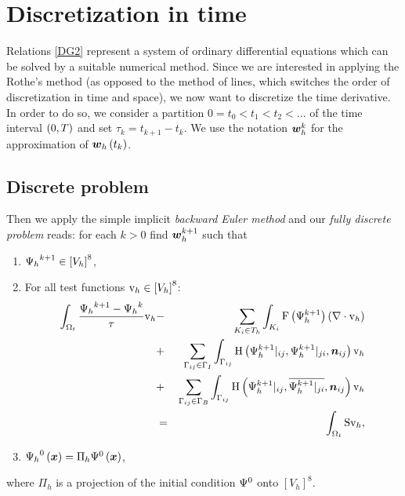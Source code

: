\section{Discretization in time}
Relations \ref{DG2} represent a system of ordinary differential equations which can be solved by a suitable numerical method. Since we are interested in applying the Rothe's method (as opposed to the method of lines, which switches the order of discretization in time and space), we now want to discretize the time derivative. In order to do so, we consider a partition $0 = t_0 < t_1 < t_2 < ...$ of the time interval $\left( 0, T\right)$ and set $\tau_k = t_{k+1} - t_k$. We use the notation $\mbox{\boldmath $w$}_h^k$ for the approximation of $\mbox{\boldmath $w$}_h\left( t_k\right)$.

\subsection{Discrete problem}
\label{section:discreteProblem}
Then we apply the simple implicit \emph{backward Euler method} and our \emph{fully discrete problem} reads: for each $k > 0$ find $\mbox{\boldmath $w$}_h^{k+1}$ such that
\begin{enumerate}
    \item ${\mathrm{\Psi}_h}^{k+1} \in \left[V_h\right]^8$,
    \item For all test functions $\mathrm{v}_h\in\left[V_h\right]^8$:
    \begin{eqnarray}
    \label{DiscretizedFull} \int_{\Omega_{t}} \frac{{\mathrm{\Psi}_h}^{k+1} - {\mathrm{\Psi}_h}^{k}}{\tau} \mathrm{v}_h & - & \sum_{K_i \in T_h}\int_{K_i}\mathrm{F}\left({\mathrm{\Psi}_h^{k+1}}\right) \left(\nabla \cdot \mathrm{v}_h\right)\\ \nonumber & + & \sum_{\Gamma_{ij}\in\Gamma_I} \int_{\Gamma_{ij}} \mathrm{H}\left({\mathrm{\Psi}_h^{k+1}}|_{ij}, {\mathrm{\Psi}_h^{k+1}}|_{ji}, \mbox{\boldmath $n$}_{ij}\right) \mathrm{v}_h \\\nonumber
     & + & \sum_{\Gamma_{ij}\in\Gamma_B} \int_{\Gamma_{ij}} \mathrm{H}\left({\mathrm{\Psi}_h^{k+1}}|_{ij}, \overline{{\mathrm{\Psi}_h^{k+1}}|_{ji}}, \mbox{\boldmath $n$}_{ij}\right) \mathrm{v}_h\\\nonumber
     & = & \int_{\Omega_{t}} \mathrm{S} \mathrm{v}_h,
    \end{eqnarray}
    \item ${\mathrm{\Psi}_h}^{0}\left(\mbox{\boldmath $x$}\right) = \Pi_h \mathrm{\Psi}^0\left(\mbox{\boldmath $x$}\right)$,
\end{enumerate}
where $\Pi_h$ is a projection of the initial condition $\mathrm{\Psi}^0$ onto $\left[V_h\right]^8$.